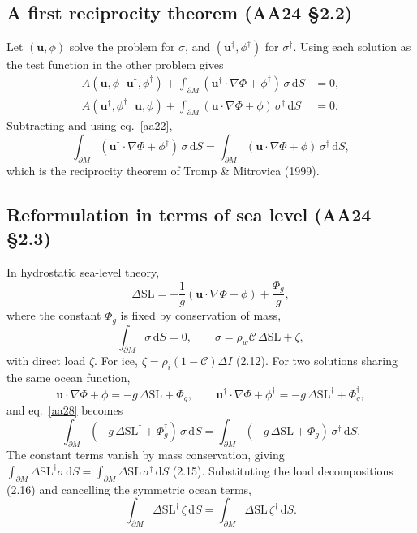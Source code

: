 \documentclass[11pt,a4paper]{article}
\newcommand{\bu}{\mathbf{u}}
\newcommand{\dSL}{\Delta\mathrm{SL}}
\newcommand{\oc}{\mathcal{C}}
\newcommand{\dd}{\,\mathrm{d}}
\newcommand{\pM}{\partial M}
\begin{document}
\subsection{A first reciprocity theorem (AA24 \S2.2)}

Let $(\bu,\phi)$ solve the problem for $\sigma$, and $(\bu^\dagger,\phi^\dagger)$ for $\sigma^\dagger$.
Using each solution as the test function in the other problem gives
\begin{align}
  A(\bu,\phi\,|\,\bu^\dagger,\phi^\dagger)+\int_{\pM}(\bu^\dagger\cdot\nabla\Phi+\phi^\dagger)\,\sigma\dd S&=0,\tag{2.6}\\
  A(\bu^\dagger,\phi^\dagger\,|\,\bu,\phi)+\int_{\pM}(\bu\cdot\nabla\Phi+\phi)\,\sigma^\dagger\dd S&=0.\tag{2.7}
\end{align}
Subtracting and using eq.~\eqref{aa22},
\begin{equation}
  \int_{\pM}(\bu^\dagger\cdot\nabla\Phi+\phi^\dagger)\,\sigma\dd S
  =\int_{\pM}(\bu\cdot\nabla\Phi+\phi)\,\sigma^\dagger\dd S ,
  \tag{2.8}\label{aa28}
\end{equation}
which is the reciprocity theorem of Tromp \& Mitrovica (1999).

\subsection{Reformulation in terms of sea level (AA24 \S2.3)}

In hydrostatic sea-level theory,
\begin{equation}
  \dSL=-\frac{1}{g}(\bu\cdot\nabla\Phi+\phi)+\frac{\Phi_g}{g},
  \tag{2.9}\label{aa29}
\end{equation}
where the constant $\Phi_g$ is fixed by conservation of mass,
\begin{equation}
  \int_{\pM}\sigma\dd S=0,\qquad \sigma=\rho_w\oc\,\dSL+\zeta ,
  \tag{2.10--2.11}\label{aa211}
\end{equation}
with direct load $\zeta$. For ice, $\zeta=\rho_i(1-\oc)\Delta I$ (2.12). For two solutions sharing
the same ocean function,
\begin{equation}
  \bu\cdot\nabla\Phi+\phi=-g\,\dSL+\Phi_g,\qquad
  \bu^\dagger\cdot\nabla\Phi+\phi^\dagger=-g\,\dSL^\dagger+\Phi_g^\dagger,
  \tag{2.13}
\end{equation}
and eq.~\eqref{aa28} becomes
\begin{equation}
  \int_{\pM}(-g\,\dSL^\dagger+\Phi_g^\dagger)\,\sigma\dd S=\int_{\pM}(-g\,\dSL+\Phi_g)\,\sigma^\dagger\dd S .
  \tag{2.14}
\end{equation}
The constant terms vanish by mass conservation, giving
$\int_{\pM}\dSL^\dagger\sigma\dd S=\int_{\pM}\dSL\,\sigma^\dagger\dd S$ (2.15). Substituting the
load decompositions (2.16) and cancelling the symmetric ocean terms,
\begin{equation}
  \int_{\pM}\dSL^\dagger\,\zeta\dd S=\int_{\pM}\dSL\,\zeta^\dagger\dd S .
  \tag{2.17}\label{aa217}
\end{equation}
\end{document}
